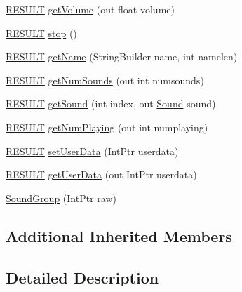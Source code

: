 \begin{DoxyCompactItemize}
\item 
\hyperlink{namespace_f_m_o_d_a305d1176ef3f8c8815861a60407ac33d}{R\+E\+S\+U\+LT} \hyperlink{class_f_m_o_d_1_1_sound_group_a15bc18aab8645f3acf37404970d090f2}{get\+Volume} (out float volume)
\item 
\hyperlink{namespace_f_m_o_d_a305d1176ef3f8c8815861a60407ac33d}{R\+E\+S\+U\+LT} \hyperlink{class_f_m_o_d_1_1_sound_group_a925cd965a5b796515c94e60bb4951ba8}{stop} ()
\item 
\hyperlink{namespace_f_m_o_d_a305d1176ef3f8c8815861a60407ac33d}{R\+E\+S\+U\+LT} \hyperlink{class_f_m_o_d_1_1_sound_group_a3356275a6774c1f99bad0bf61682ac45}{get\+Name} (String\+Builder name, int namelen)
\item 
\hyperlink{namespace_f_m_o_d_a305d1176ef3f8c8815861a60407ac33d}{R\+E\+S\+U\+LT} \hyperlink{class_f_m_o_d_1_1_sound_group_a82d3cd3500a5befad41630a8383d5f69}{get\+Num\+Sounds} (out int numsounds)
\item 
\hyperlink{namespace_f_m_o_d_a305d1176ef3f8c8815861a60407ac33d}{R\+E\+S\+U\+LT} \hyperlink{class_f_m_o_d_1_1_sound_group_a1e42f0b0d90d30f70fc751367ca0b6e2}{get\+Sound} (int index, out \hyperlink{class_f_m_o_d_1_1_sound}{Sound} sound)
\item 
\hyperlink{namespace_f_m_o_d_a305d1176ef3f8c8815861a60407ac33d}{R\+E\+S\+U\+LT} \hyperlink{class_f_m_o_d_1_1_sound_group_a0212da67240536acb48477d47935c5a3}{get\+Num\+Playing} (out int numplaying)
\item 
\hyperlink{namespace_f_m_o_d_a305d1176ef3f8c8815861a60407ac33d}{R\+E\+S\+U\+LT} \hyperlink{class_f_m_o_d_1_1_sound_group_ac73a1233539877dd44a467120e50735b}{set\+User\+Data} (Int\+Ptr userdata)
\item 
\hyperlink{namespace_f_m_o_d_a305d1176ef3f8c8815861a60407ac33d}{R\+E\+S\+U\+LT} \hyperlink{class_f_m_o_d_1_1_sound_group_ae5e45ff7f79cac2160adbc630188712c}{get\+User\+Data} (out Int\+Ptr userdata)
\item 
\hyperlink{class_f_m_o_d_1_1_sound_group_a5e378cf59fdf3f1ba8639d35243440a4}{Sound\+Group} (Int\+Ptr raw)
\end{DoxyCompactItemize}
\subsection*{Additional Inherited Members}


\subsection{Detailed Description}


